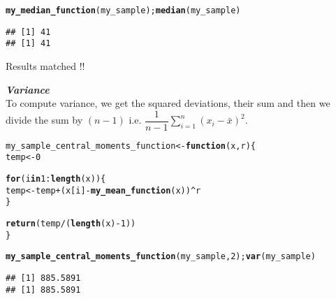 \documentclass[11pt, a4paper]{article}\usepackage[]{graphicx}\usepackage[]{xcolor}
\makeatletter
\newcommand{\hlnum}[1]{\textcolor[rgb]{0.686,0.059,0.569}{#1}}%
\newcommand{\hlopt}[1]{\textcolor[rgb]{0,0,0}{#1}}%
\newcommand{\hldef}[1]{\textcolor[rgb]{0.345,0.345,0.345}{#1}}%
\newcommand{\hlkwa}[1]{\textcolor[rgb]{0.161,0.373,0.58}{\textbf{#1}}}%
\newcommand{\hlkwb}[1]{\textcolor[rgb]{0.69,0.353,0.396}{#1}}%
\newcommand{\hlkwc}[1]{\textcolor[rgb]{0.333,0.667,0.333}{#1}}%
\newcommand{\hlkwd}[1]{\textcolor[rgb]{0.737,0.353,0.396}{\textbf{#1}}}%
\newenvironment{kframe}{%
 \def\at@end@of@kframe{}%
 \ifinner\ifhmode%
  \def\at@end@of@kframe{\end{minipage}}%
  \begin{minipage}{\columnwidth}%
 \fi\fi%
 \def\FrameCommand##1{\hskip\@totalleftmargin \hskip-\fboxsep
 \colorbox{shadecolor}{##1}\hskip-\fboxsep
     \hskip-\linewidth \hskip-\@totalleftmargin \hskip\columnwidth}%
 \MakeFramed {\advance\hsize-\width
   \@totalleftmargin\z@ \linewidth\hsize
   \@setminipage}}%
 {\par\unskip\endMakeFramed%
 \at@end@of@kframe}
\newenvironment{knitrout}{}{} %
\makeatother
\begin{document}
\begin{knitrout}\footnotesize
{}\color{fgcolor}\begin{kframe}
\begin{alltt}
\hlkwd{my_median_function}\hldef{(my_sample);} \hlkwd{median}\hldef{(my_sample)}
\end{alltt}
\begin{verbatim}
## [1] 41
## [1] 41
\end{verbatim}
\end{kframe}
\end{knitrout}

\faCheckCircle[regular] Results matched !! \\

\vspace{1cm}

\faArrowAltCircleRight[regular] \textit{\textbf{Variance}} \\

To compute variance, we get the squared deviations, their sum and then we divide the sum by $(n-1)$ i.e. $\dfrac{1}{n-1} \sum \limits_{i = 1}^{n} (x_{i} - \bar{x})^2$.
\begin{knitrout}\footnotesize
{}\color{fgcolor}\begin{kframe}
\begin{alltt}
\hldef{my_sample_central_moments_function} \hlkwb{<-} \hlkwa{function}\hldef{(}\hlkwc{x}\hldef{,} \hlkwc{r}\hldef{)\{}
  \hldef{temp} \hlkwb{<-} \hlnum{0}

  \hlkwa{for} \hldef{(i} \hlkwa{in} \hlnum{1}\hlopt{:}\hlkwd{length}\hldef{(x)) \{}
    \hldef{temp} \hlkwb{<-} \hldef{temp} \hlopt{+} \hldef{(x[i]} \hlopt{-} \hlkwd{my_mean_function}\hldef{(x))}\hlopt{^}\hldef{r}
  \hldef{\}}

  \hlkwd{return}\hldef{(temp} \hlopt{/} \hldef{(}\hlkwd{length}\hldef{(x)} \hlopt{-} \hlnum{1}\hldef{))}
\hldef{\}}
\end{alltt}
\end{kframe}
\end{knitrout}

\begin{knitrout}\footnotesize
{}\color{fgcolor}\begin{kframe}
\begin{alltt}
\hlkwd{my_sample_central_moments_function}\hldef{(my_sample,} \hlnum{2}\hldef{);} \hlkwd{var}\hldef{(my_sample)}
\end{alltt}
\begin{verbatim}
## [1] 885.5891
## [1] 885.5891
\end{verbatim}
\end{kframe}
\end{knitrout}
\end{document}
